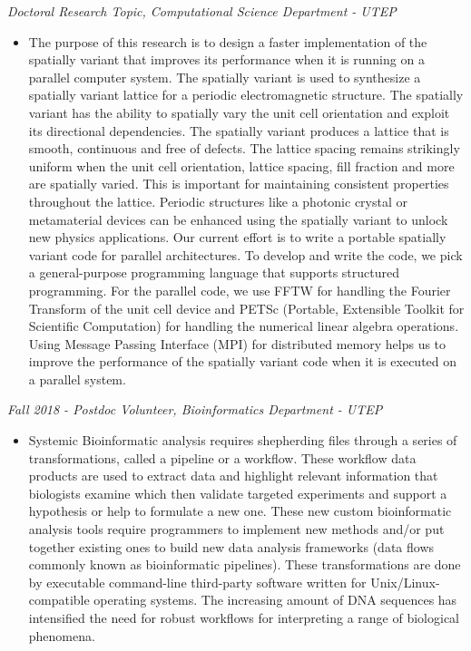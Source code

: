 \documentclass[margin]{res}
\begin{document}
\begin{resume}
{\sl Doctoral Research Topic, Computational Science Department - UTEP} %
\begin{itemize}\itemsep -2pt
\item The purpose of this research is to design a faster implementation of the spatially variant that improves its performance when it is running on a parallel computer system. 
The spatially variant is used to synthesize a spatially variant lattice for a periodic electromagnetic structure. The spatially variant has the ability to spatially vary the unit
cell orientation and exploit its directional dependencies. The spatially variant produces a lattice that is smooth, continuous and free of defects. The lattice spacing remains strikingly
uniform when the unit cell orientation, lattice spacing, fill fraction and more are spatially varied. This is important for maintaining consistent properties throughout the lattice.
Periodic structures like a photonic crystal or metamaterial devices can be enhanced using the spatially variant to unlock new physics applications.
Our current effort is to write a portable spatially variant code for parallel architectures. To develop and write the code, we pick a general-purpose programming language
that supports structured programming. For the parallel code, we use FFTW for handling the Fourier Transform of the unit cell device and PETSc 
(Portable, Extensible Toolkit for Scientific Computation) for handling the numerical linear algebra operations. Using Message Passing Interface (MPI) for distributed memory
helps us to improve the performance of the spatially variant code when it is executed on a parallel system. 
\end{itemize}

{\sl Fall 2018 - Postdoc Volunteer, Bioinformatics Department - UTEP} %
\begin{itemize}\itemsep -2pt
\item Systemic Bioinformatic analysis requires shepherding files through a series of transformations, called a pipeline or a workflow.
These workflow data products are used to extract data and highlight relevant information that biologists examine which then validate targeted 
experiments and support a hypothesis or help to formulate a new one. These new custom bioinformatic analysis tools require programmers to implement
new methods and/or put together existing ones to build new data analysis frameworks (data flows commonly known as bioinformatic pipelines).
These transformations are done by executable command-line third-party software written for Unix/Linux-compatible operating systems. The increasing amount of DNA
sequences has intensified the need for robust workflows for interpreting a range of biological phenomena.
\end{itemize}


\end{resume}
\end{document}
